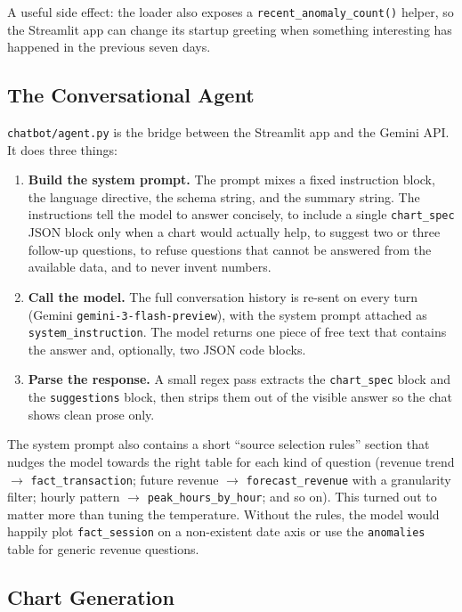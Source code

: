 A useful side effect: the loader also exposes a
\texttt{recent\_anomaly\_count()} helper, so the Streamlit app can change
its startup greeting when something interesting has happened in the
previous seven days.

\subsection{The Conversational Agent}

\texttt{chatbot/agent.py} is the bridge between the Streamlit app and
the Gemini API. It does three things:

\begin{enumerate}
  \item \textbf{Build the system prompt.} The prompt mixes a fixed
        instruction block, the language directive, the schema string, and
        the summary string. The instructions tell the model to answer
        concisely, to include a single \texttt{chart\_spec} JSON block
        only when a chart would actually help, to suggest two or three
        follow-up questions, to refuse questions that cannot be answered
        from the available data, and to never invent numbers.
  \item \textbf{Call the model.} The full conversation history is
        re-sent on every turn (Gemini \texttt{gemini-3-flash-preview}),
        with the system prompt attached as
        \texttt{system\_instruction}. The model returns one piece of
        free text that contains the answer and, optionally, two JSON
        code blocks.
  \item \textbf{Parse the response.} A small regex pass extracts the
        \texttt{chart\_spec} block and the \texttt{suggestions} block,
        then strips them out of the visible answer so the chat shows
        clean prose only.
\end{enumerate}

The system prompt also contains a short ``source selection rules''
section that nudges the model towards the right table for each kind of
question (revenue trend $\to$ \texttt{fact\_transaction}; future
revenue $\to$ \texttt{forecast\_revenue} with a granularity filter;
hourly pattern $\to$ \texttt{peak\_hours\_by\_hour}; and so on). This
turned out to matter more than tuning the temperature. Without the rules,
the model would happily plot \texttt{fact\_session} on a non-existent
date axis or use the \texttt{anomalies} table for generic revenue
questions.

\subsection{Chart Generation}


